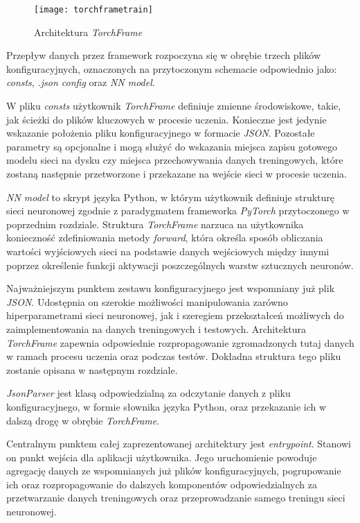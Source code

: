       \begin{figure}[h!]
        \centering
        \texttt{[image: torchframetrain]}
        \caption[Architektura \textit{TorchFrame} - źródło: Praca własna]{Architektura \textit{TorchFrame}}
        \label{fig:torchframetrain}
      \end{figure}

    Przepływ danych przez framework rozpoczyna się w obrębie trzech plików konfiguracyjnych,
    oznaczonych na przytoczonym schemacie odpowiednio jako: \textit{consts}, \textit{.json config}
    oraz \textit{NN model}.

    W pliku \textit{consts} użytkownik \textit{TorchFrame} definiuje zmienne środowiskowe, takie, jak
    ścieżki do plików kluczowych w procesie uczenia. Konieczne jest jedynie wskazanie
    położenia pliku konfiguracyjnego w formacie \textit{JSON}. Pozostałe parametry są opcjonalne
    i mogą służyć do wskazania miejsca zapisu gotowego modelu sieci na dysku czy miejsca
    przechowywania danych treningowych, które zostaną następnie przetworzone i przekazane
    na wejście sieci w procesie uczenia.

    \textit{NN model} to skrypt języka Python, w którym użytkownik definiuje strukturę sieci
    neuronowej zgodnie z paradygmatem frameworka \textit{PyTorch} przytoczonego w poprzednim
    rozdziale. Struktura \textit{TorchFrame} narzuca na użytkownika konieczność zdefiniowania
    metody \textit{forward}, która określa sposób obliczania wartości wyjściowych sieci na podstawie danych
    wejściowych między innymi poprzez określenie funkcji aktywacji poszczególnych warstw
    sztucznych neuronów.

    Najważniejszym punktem zestawu konfiguracyjnego jest wspomniany już plik \textit{JSON}.
    Udostępnia on szerokie możliwości manipulowania zarówno hiperparametrami sieci
    neuronowej, jak i szeregiem przekształceń możliwych do zaimplementowania
    na danych treningowych i testowych. Architektura \textit{TorchFrame} zapewnia odpowiednie
    rozpropagowanie zgromadzonych tutaj danych w ramach procesu uczenia oraz podczas
    testów. Dokładna struktura tego pliku zostanie opisana w następnym rozdziale.

    \textit{JsonParser} jest klasą odpowiedzialną za odczytanie danych z pliku konfiguracyjnego,
    w formie słownika języka Python, oraz przekazanie ich w dalszą drogę w obrębie \textit{TorchFrame}.

    Centralnym punktem całej zaprezentowanej architektury jest \textit{entrypoint}. Stanowi on
    punkt wejścia dla aplikacji użytkownika. Jego uruchomienie powoduje
    agregację danych ze wspomnianych już plików konfiguracyjnych, pogrupowanie ich
    oraz rozpropagowanie do dalszych komponentów odpowiedzialnych za przetwarzanie
    danych treningowych oraz przeprowadzanie samego treningu sieci neuronowej.


